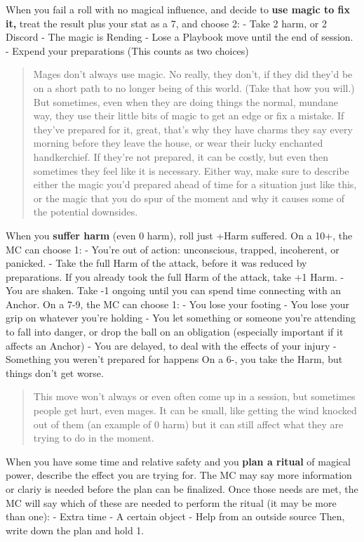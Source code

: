 \documentclass[
  oneside,
  statementpaper,
  9pt]{memoir}
\begin{document}
When you fail a roll with no magical influence, and decide to
\textbf{use magic to fix it,} treat the result plus your stat as a 7,
and choose 2: - Take 2 harm, or 2 Discord - The magic is Rending - Lose
a Playbook move until the end of session. - Expend your preparations
(This counts as two choices)

\begin{quote}
Mages don't always use magic. No really, they don't, if they did they'd
be on a short path to no longer being of this world. (Take that how you
will.) But sometimes, even when they are doing things the normal,
mundane way, they use their little bits of magic to get an edge or fix a
mistake. If they've prepared for it, great, that's why they have charms
they say every morning before they leave the house, or wear their lucky
enchanted handkerchief. If they're not prepared, it can be costly, but
even then sometimes they feel like it is necessary. Either way, make
sure to describe either the magic you'd prepared ahead of time for a
situation just like this, or the magic that you do spur of the moment
and why it causes some of the potential downsides.
\end{quote}

When you \textbf{suffer harm} (even 0 harm), roll just +Harm suffered.
On a 10+, the MC can choose 1: - You're out of action: unconscious,
trapped, incoherent, or panicked. - Take the full Harm of the attack,
before it was reduced by preparations. If you already took the full Harm
of the attack, take +1 Harm. - You are shaken. Take -1 ongoing until you
can spend time connecting with an Anchor. On a 7-9, the MC can choose 1:
- You lose your footing - You lose your grip on whatever you're holding
- You let something or someone you're attending to fall into danger, or
drop the ball on an obligation (especially important if it affects an
Anchor) - You are delayed, to deal with the effects of your injury -
Something you weren't prepared for happens On a 6-, you take the Harm,
but things don't get worse.

\begin{quote}
This move won't always or even often come up in a session, but sometimes
people get hurt, even mages. It can be small, like getting the wind
knocked out of them (an example of 0 harm) but it can still affect what
they are trying to do in the moment.
\end{quote}

When you have some time and relative safety and you \textbf{plan a
ritual} of magical power, describe the effect you are trying for. The MC
may say more information or clariy is needed before the plan can be
finalized. Once those needs are met, the MC will say which of these are
needed to perform the ritual (it may be more than one): - Extra time - A
certain object - Help from an outside source Then, write down the plan
and hold 1.
\end{document}
